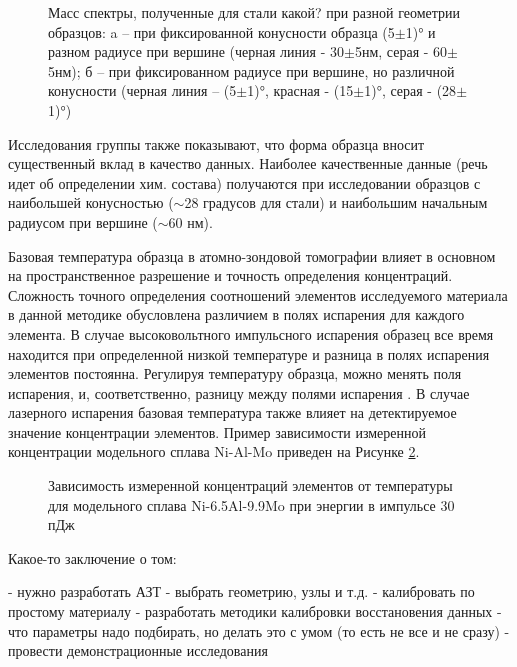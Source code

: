 \begin{figure}[htb]
	\caption{Масс спектры, полученные для стали какой? при разной геометрии образцов: a – при фиксированной конусности образца (5$\pm$1)° и разном радиусе при вершине (черная линия - 30$\pm$5нм, серая - 60$\pm$5нм); б – при фиксированном радиусе при вершине, но различной конусности (черная линия – (5$\pm$1)°, красная - (15$\pm$1)°, серая - (28$\pm$1)°)\cite{Arnoldi12}}
	\label{fig:ParamsGeometry}
\end{figure}

\FloatBarrier

Исследования группы \cite{Arnoldi12} также показывают, что форма образца вносит существенный вклад в качество данных. Наиболее качественные данные (речь идет об определении хим. состава) получаются при исследовании образцов с наибольшей конусностью ($\sim$28 градусов для стали) и наибольшим начальным радиусом при вершине ($\sim$60 нм).

Базовая температура образца в атомно-зондовой томографии влияет в основном на пространственное разрешение \cite{GaultBOOK}  и точность определения концентраций. Сложность точного определения соотношений элементов исследуемого материала в данной методике обусловлена различием в полях испарения для каждого элемента. В случае высоковольтного импульсного испарения образец все время находится при определенной низкой температуре и разница в полях испарения элементов постоянна. Регулируя температуру образца, можно менять поля испарения, и, соответственно, разницу между полями испарения \cite{Wada84}.
В случае лазерного испарения базовая температура также влияет на детектируемое значение концентрации элементов. Пример зависимости измеренной концентрации модельного сплава Ni-Al-Mo приведен на Рисунке \cref{fig:ParamsTemperatureComposition}.

\begin{figure}[htb]
	\caption{Зависимость измеренной концентраций элементов от температуры для модельного сплава Ni-6.5Al-9.9Mo при энергии в импульсе 30 пДж \cite{Tu15}}
	\label{fig:ParamsTemperatureComposition}
\end{figure}



\FloatBarrier

Какое-то заключение о том:

- нужно разработать АЗТ
- выбрать геометрию, узлы и т.д.
- калибровать по простому материалу
- разработать методики калибровки восстановения данных
- что параметры надо подбирать, но делать это с умом (то есть не все и не сразу)
- провести демонстрационные исследования


























